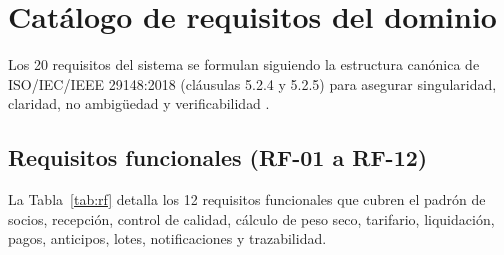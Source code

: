 \section{Cat\'alogo de requisitos del dominio}
\label{sec:requisitos}

Los 20 requisitos del sistema se formulan siguiendo la estructura can\'onica de ISO/IEC/IEEE 29148:2018 (cl\'ausulas 5.2.4 y 5.2.5) para asegurar singularidad, claridad, no ambig\"uedad y verificabilidad \cite{iso29148}.

\subsection{Requisitos funcionales (RF-01 a RF-12)}
\label{subsec:rf}

La Tabla~\ref{tab:rf} detalla los 12 requisitos funcionales que cubren el padr\'on de socios, recepci\'on, control de calidad, c\'alculo de peso seco, tarifario, liquidaci\'on, pagos, anticipos, lotes, notificaciones y trazabilidad.


